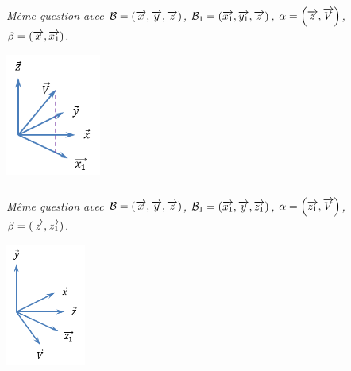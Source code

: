 \documentclass[11pt,oneside]{article}
\begin{document}

\begin{minipage}[c]{.7\linewidth}
\subparagraph{}
\textit{Même question avec $\mathcal{B}=(\overrightarrow{x},\overrightarrow{y},\overrightarrow{z})$, $\mathcal{B}_1=(\overrightarrow{x_1},\overrightarrow{y_1},\overrightarrow{z})$,  $\alpha=\left(\overrightarrow{z},\overrightarrow{V}\right)$, $\beta=\left(\overrightarrow{x},\overrightarrow{x_1} \right)$.}
\end{minipage} \hfill
\begin{minipage}[c]{.29\linewidth}
\begin{center}
\includegraphics[height=4cm]{png/exo4_3}
\end{center}
\end{minipage}



\begin{minipage}[c]{.7\linewidth}
\subparagraph{}
\textit{Même question avec $\mathcal{B}=(\overrightarrow{x},\overrightarrow{y},\overrightarrow{z})$, $\mathcal{B}_1=(\overrightarrow{x_1},\overrightarrow{y},\overrightarrow{z_1})$,  $\alpha=\left(\overrightarrow{z_1},\overrightarrow{V}\right)$, $\beta=\left(\overrightarrow{z},\overrightarrow{z_1} \right)$.}
\end{minipage} \hfill
\begin{minipage}[c]{.29\linewidth}
\begin{center}
\includegraphics[height=4cm]{png/exo4_4}
\end{center}
\end{minipage}

\end{document}
